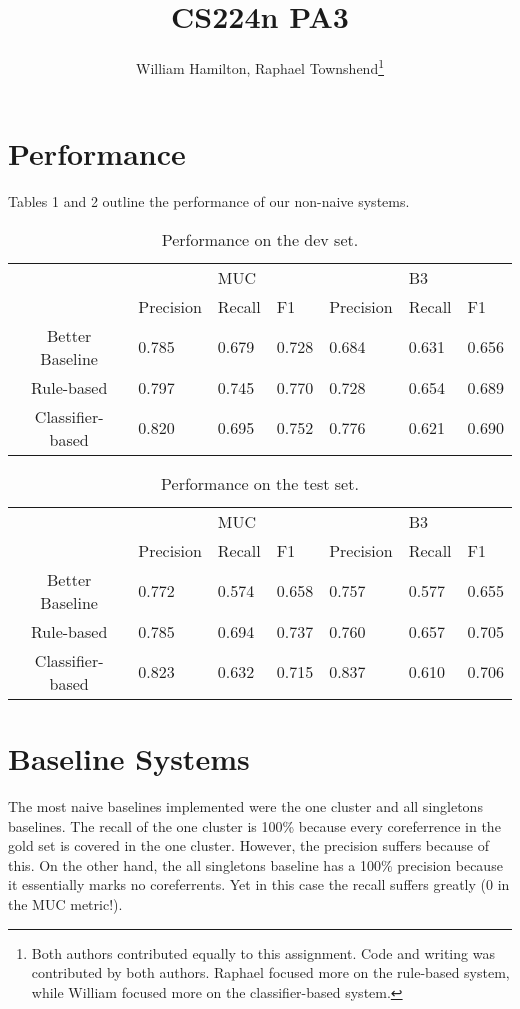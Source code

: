 \documentclass[12pt,a4paper]{article}
\author{William Hamilton, Raphael Townshend\footnote{Both authors contributed equally to this assignment. Code and writing was contributed by both authors. Raphael focused more on the rule-based system, while William focused more on the classifier-based system.}}
\title{CS224n PA3}
\begin{document}
\maketitle
\section{Performance}
Tables 1 and 2 outline the performance of our non-naive systems. 
\begin{table}[h!]
\centering
\begin{tabular}{c|m{40pt} m{40pt} m{40pt}| m{40pt} m{40pt} m{40pt}}
 &  & MUC &  &  & B3 &  \\ 
& Precision & Recall & F1 & Precision & Recall & F1 \\ 
\hline 
Better Baseline & 0.785 & 0.679 & 0.728 & 0.684 & 0.631 & 0.656 \\
Rule-based  & 0.797 & 0.745 & 0.770 & 0.728 & 0.654 & 0.689 \\ 
Classifier-based & 0.820 & 0.695 & 0.752 & 0.776 & 0.621 & 0.690 \\ 
\hline 
\end{tabular}
\caption{Performance on the dev set.}
\end{table} 
\begin{table}[h!]
\centering
\begin{tabular}{c|m{40pt} m{40pt} m{40pt}| m{40pt} m{40pt} m{40pt}}
 &  & MUC &  &  & B3 &  \\ 
& Precision & Recall & F1 & Precision & Recall & F1 \\ 
\hline 
Better Baseline & 0.772 & 0.574 & 0.658 & 0.757 & 0.577 & 0.655 \\
Rule-based  & 0.785 & 0.694 & 0.737 & 0.760 & 0.657 & 0.705 \\ 
Classifier-based & 0.823 & 0.632 & 0.715 & 0.837 & 0.610 & 0.706 \\ 
\hline 
\end{tabular}
\caption{Performance on the test set.}
\end{table} 

\section{Baseline Systems}

The most naive baselines implemented were the one cluster and all singletons baselines. The recall of the one cluster is 100\% because every coreferrence in the gold set is covered in the one cluster.  However, the precision suffers because of this.  On the other hand, the all singletons baseline has a 100\% precision because it essentially marks no coreferrents. Yet in this case the recall suffers greatly (0 in the MUC metric!).
\end{document}
